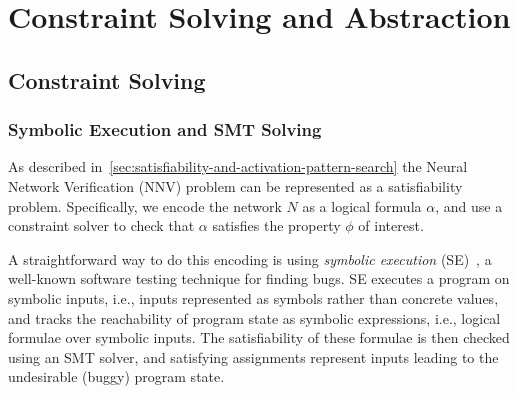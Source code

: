 \documentclass[oneside,11pt,dvipsnames]{book}
\numberwithin{equation}{section}
\theoremstyle{definition}
\theoremstyle{remark}
\newcommand{\tvn}[1]{\iftoggle{usecomment}{{\color{red}{[TVN]: #1}}}{}}
\begin{document}









\part{Constraint Solving and Abstraction}

\chapter{Constraint Solving}\label{chap:constraint-solving}

\section{Symbolic Execution and SMT Solving}\label{sec:se-smt}

As described in~\autoref{sec:satisfiability-and-activation-pattern-search} the Neural Network Verification (NNV) problem can be represented as a satisfiability problem. Specifically, we encode the network $N$ as a logical formula $\alpha$, and use a constraint solver to check that $\alpha$ satisfies the property $\phi$ of interest.

A straightforward way to do this encoding is using \emph{symbolic execution} (SE)~\cite{baldoni2018survey,king1976symbolic}, a well-known software testing technique for finding bugs.  SE executes a program on symbolic inputs, i.e., inputs represented as symbols rather than concrete values, and tracks the reachability of program state as symbolic expressions, i.e., logical formulae over symbolic inputs. The satisfiability of these formulae is then checked using an SMT solver, and satisfying assignments represent inputs leading to the undesirable (buggy) program state.
\end{document}
